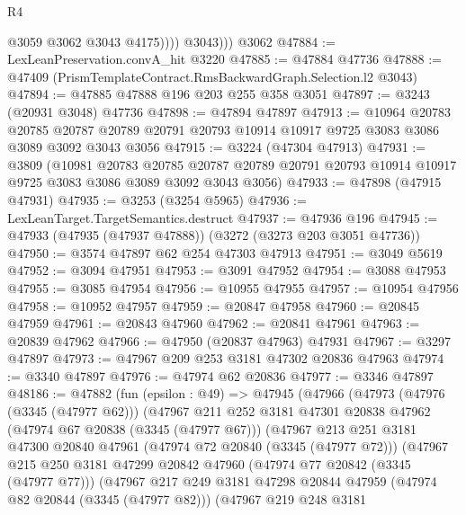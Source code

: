 \begin{lexlean}{R4}
\begin{coremodule}
                @3059
                @3062
                @3043
                @4175))))
          @3043)))
    @3062
@47884 := LexLeanPreservation.convA_hit @3220
@47885 := @47884 @47736
@47888 := @47409 (PrismTemplateContract.RmsBackwardGraph.Selection.l2 @3043)
@47894 := @47885 @47888 @196 @203 @255 @358 @3051
@47897 := @3243 (@20931 @3048) @47736
@47898 := @47894 @47897
@47913 := @10964
    @20783
    @20785
    @20787
    @20789
    @20791
    @20793
    @10914
    @10917
    @9725
    @3083
    @3086
    @3089
    @3092
    @3043
    @3056
@47915 := @3224 (@47304 @47913)
@47931 := @3809
    (@10981
      @20783
      @20785
      @20787
      @20789
      @20791
      @20793
      @10914
      @10917
      @9725
      @3083
      @3086
      @3089
      @3092
      @3043
      @3056)
@47933 := @47898 (@47915 @47931)
@47935 := @3253 (@3254 @5965)
@47936 := LexLeanTarget.TargetSemantics.destruct
@47937 := @47936 @196
@47945 := @47933 (@47935 (@47937 @47888)) (@3272 (@3273 @203 @3051 @47736))
@47950 := @3574 @47897 @62 @254 @47303 @47913
@47951 := @3049 @5619
@47952 := @3094 @47951
@47953 := @3091 @47952
@47954 := @3088 @47953
@47955 := @3085 @47954
@47956 := @10955 @47955
@47957 := @10954 @47956
@47958 := @10952 @47957
@47959 := @20847 @47958
@47960 := @20845 @47959
@47961 := @20843 @47960
@47962 := @20841 @47961
@47963 := @20839 @47962
@47966 := @47950 (@20837 @47963) @47931
@47967 := @3297 @47897
@47973 := @47967 @209 @253 @3181 @47302 @20836 @47963
@47974 := @3340 @47897
@47976 := @47974 @62 @20836
@47977 := @3346 @47897
@48186 := @47882
    (fun (epsilon : @49) =>
    @47945
      (@47966
        (@47973
          (@47976 (@3345 (@47977 @62)))
          (@47967
            @211
            @252
            @3181
            @47301
            @20838
            @47962
            (@47974 @67 @20838 (@3345 (@47977 @67)))
            (@47967
              @213
              @251
              @3181
              @47300
              @20840
              @47961
              (@47974 @72 @20840 (@3345 (@47977 @72)))
              (@47967
                @215
                @250
                @3181
                @47299
                @20842
                @47960
                (@47974 @77 @20842 (@3345 (@47977 @77)))
                (@47967
                  @217
                  @249
                  @3181
                  @47298
                  @20844
                  @47959
                  (@47974 @82 @20844 (@3345 (@47977 @82)))
                  (@47967
                    @219
                    @248
                    @3181

\end{coremodule}
\end{lexlean}
